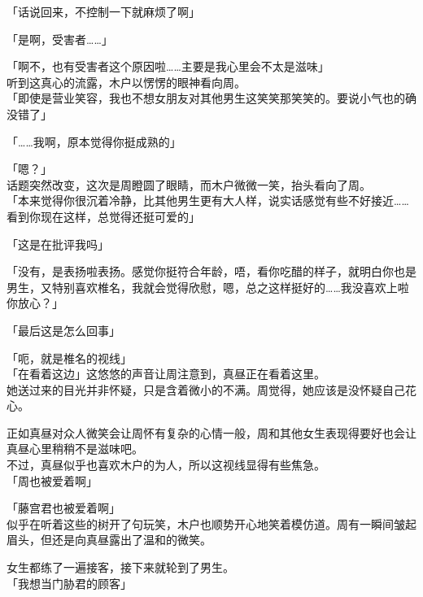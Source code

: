 「话说回来，不控制一下就麻烦了啊」

「是啊，受害者……」

「啊不，也有受害者这个原因啦……主要是我心里会不太是滋味」\\

听到这真心的流露，木户以愣愣的眼神看向周。\\

「即使是营业笑容，我也不想女朋友对其他男生这笑笑那笑笑的。要说小气也的确没错了」

「……我啊，原本觉得你挺成熟的」

「嗯？」\\

话题突然改变，这次是周瞪圆了眼睛，而木户微微一笑，抬头看向了周。\\

「本来觉得你很沉着冷静，比其他男生更有大人样，说实话感觉有些不好接近……看到你现在这样，总觉得还挺可爱的」

「这是在批评我吗」

「没有，是表扬啦表扬。感觉你挺符合年龄，唔，看你吃醋的样子，就明白你也是男生，又特别喜欢椎名，我就会觉得欣慰，嗯，总之这样挺好的……我没喜欢上啦你放心？」

「最后这是怎么回事」

「呃，就是椎名的视线」\\

「在看着这边」这悠悠的声音让周注意到，真昼正在看着这里。\\

她送过来的目光并非怀疑，只是含着微小的不满。周觉得，她应该是没怀疑自己花心。

正如真昼对众人微笑会让周怀有复杂的心情一般，周和其他女生表现得要好也会让真昼心里稍稍不是滋味吧。\\

不过，真昼似乎也喜欢木户的为人，所以这视线显得有些焦急。\\

「周也被爱着啊」

「藤宫君也被爱着啊」\\

似乎在听着这些的树开了句玩笑，木户也顺势开心地笑着模仿道。周有一瞬间皱起眉头，但还是向真昼露出了温和的微笑。\\

\vspace{2\baselineskip}

女生都练了一遍接客，接下来就轮到了男生。\\

「我想当门胁君的顾客」

